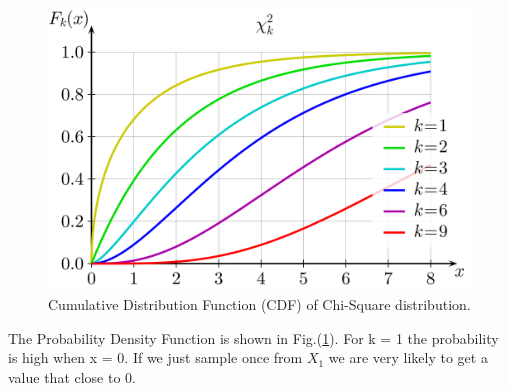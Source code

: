 \begin{figure}[h!]
\begin{center}
	\includegraphics[scale=0.07]{cs_cdf.png}
	\caption[]{Cumulative Distribution Function (CDF) of Chi-Square distribution.}
	\label{cspdf}
	\end{center}
	\end{figure}

The Probability Density Function is shown in Fig.(\ref{cspdf}). For k = 1 the probability is high when x = 0. If we just sample once from $X_1$ we are very likely to get a value that close to 0. 















